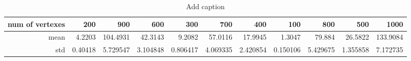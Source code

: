 \begin{table}[htbp]
  \centering
  \caption{Add caption}
    \begin{tabular}{rrrrrrrrrrr}
    \toprule
    num of vertexes & 200   & 900   & 600   & 300   & 700   & 400   & 100   & 800   & 500   & 1000 \\
    \midrule
    mean  & 4.2203 & 104.4931 & 42.3143 & 9.2082 & 57.0116 & 17.9945 & 1.3047 & 79.884 & 26.5822 & 133.9084 \\
    std   & 0.40418 & 5.729547 & 3.104848 & 0.806417 & 4.069335 & 2.420854 & 0.150106 & 5.429675 & 1.355858 & 7.172735 \\
    \bottomrule
    \end{tabular}%
  \label{tab:addlabel}%
\end{table}%
